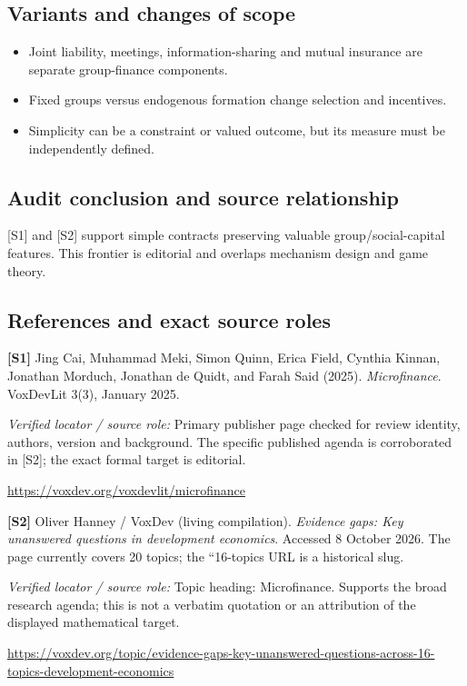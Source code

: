 \documentclass[11pt,a4paper]{article}
\begin{document}
\subsection*{Variants and changes of scope}

\begin{itemize}
\item Joint liability, meetings, information-sharing and mutual insurance are separate group-finance components.
\item Fixed groups versus endogenous formation change selection and incentives.
\item Simplicity can be a constraint or valued outcome, but its measure must be independently defined.
\end{itemize}

\subsection*{Audit conclusion and source relationship}

[S1] and [S2] support simple contracts preserving valuable group/social-capital features. This frontier is editorial and overlaps mechanism design and game theory.

\subsection*{References and exact source roles}

{\footnotesize\raggedright
\par\noindent\textbf{[S1]} Jing Cai, Muhammad Meki, Simon Quinn, Erica Field, Cynthia Kinnan, Jonathan Morduch, Jonathan de Quidt, and Farah Said (2025). \emph{Microfinance}. VoxDevLit 3(3), January 2025.\par \textit{Verified locator / source role:} Primary publisher page checked for review identity, authors, version and background. The specific published agenda is corroborated in [S2]; the exact formal target is editorial.\par \url{https://voxdev.org/voxdevlit/microfinance}\par\smallskip
\par\noindent\textbf{[S2]} Oliver Hanney / VoxDev (living compilation). \emph{Evidence gaps: Key unanswered questions in development economics}. Accessed 8 October 2026. The page currently covers 20 topics; the ``16-topics URL is a historical slug.\par \textit{Verified locator / source role:} Topic heading: Microfinance. Supports the broad research agenda; this is not a verbatim quotation or an attribution of the displayed mathematical target.\par \url{https://voxdev.org/topic/evidence-gaps-key-unanswered-questions-across-16-topics-development-economics}\par\smallskip
}
\end{document}
